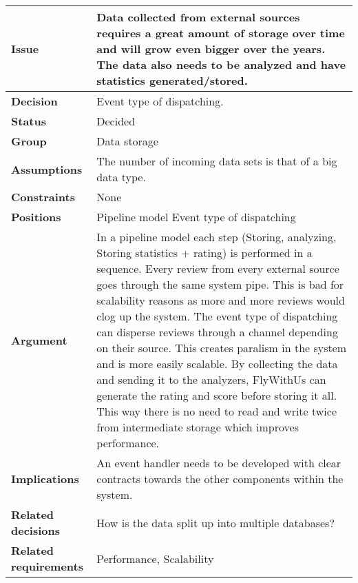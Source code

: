 
\begin{tabular}{ l  p{10cm}}
\hline
\bf Issue & Data collected from external sources requires a great amount of storage over time and will grow even bigger over the years. The data also needs to be analyzed and have statistics generated/stored.\\
\hline
\bf Decision & Event type of dispatching.\\
\hline
\bf Status & Decided\\
\hline
\bf Group & Data storage \\
\hline
\bf Assumptions & The number of incoming data sets is that of a big data type.  \\
\hline
\bf Constraints & None \\
\hline
\bf Positions & Pipeline model \newline\newline
Event type of dispatching
 \\
\hline
\bf Argument & In a pipeline model each step (Storing, analyzing, Storing statistics + rating) is performed in a sequence. Every review from every external source goes through the same system pipe. This is bad for scalability reasons as more and more reviews would clog up the system. The event type of dispatching can disperse reviews through a channel depending on their source. This creates paralism in the system and is more easily scalable. By collecting the data and sending it to the analyzers, FlyWithUs can generate the rating and score before storing it all. This way there is no need to read and write twice from intermediate storage which improves performance. \\
\hline
\bf Implications & An event handler needs to be developed with clear contracts towards the other components within the system.  \\
\hline
\bf Related decisions & How is the data split up into multiple databases? \\
\hline
\bf Related requirements  & Performance, Scalability \\
\hline
\end{tabular}

